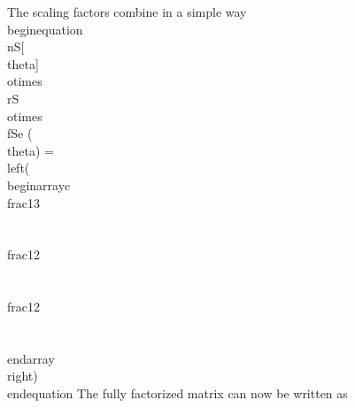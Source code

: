 The scaling factors combine in a simple way
\\begin{equation}
\\nS[\\theta] \\otimes \\rS \\otimes \\fSe (\\theta)   = 
\\left(
\\begin{array}{c}
 \\frac{1}{3}  \\\\
 \\frac{1}{2}\\\\
 \\frac{1}{2} \\\\
\\end{array}
\\right)
\\end{equation}
The fully factorized matrix can now be written as

